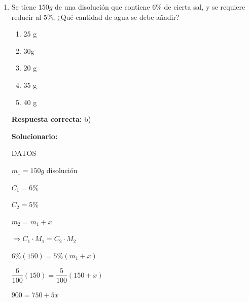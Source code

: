 \begin{enumerate}[resume]
	\begin{enumerate}[label=\alph*)]
		\item FFV
		\item VVF
		\item FVV
		\item FVF
		\item VFV
	\end{enumerate}
	
	\textbf{Respuesta correcta:} c)
	
	\vspace{2mm}
	\textbf{Solucionario:}

	Los componentes de la lluvia ácida son los ácidos azufre y nitrógeno como $H_2SO_4$ (ácido sulfúrico) y $HNO_3$ (ácido nítrico).
	
	Los gases producidos como el $NO_x$ y $SO_x$ causan la lluvia ácida.
	
	\vspace{6mm}
	
	\item Se tiene $150g$ de una disolución que contiene $6\%$ de cierta sal, y se requiere reducir al $5\%$, ¿Qué cantidad de agua se debe añadir?
	
	\begin{enumerate}[label=\alph*)]
		\item 25 g
		\item 30g
		\item 20 g
		\item 35 g
		\item 40 g
	\end{enumerate}
	
	\textbf{Respuesta correcta:} b)
	
	\vspace{2mm}
	\textbf{Solucionario:}

	DATOS 
	
	$m_1 = 150g$ disolución 
	
	$C_1 = 6\%$ 
	
	$C_2 = 5\%$ 
	
	$m_2 = m_1 + x$
	
	$\Rightarrow C_1 \cdot M_1 = C_2 \cdot M_2$ 
	
	$6\% (150) = 5\% (m_1 + x)$ 
	
	$\dfrac{6}{100} (150) = \dfrac{5}{100} (150 + x)$ 
	
	$900 = 750 + 5x$ 
	
	
	\vspace{6mm}
	
\end{enumerate}








